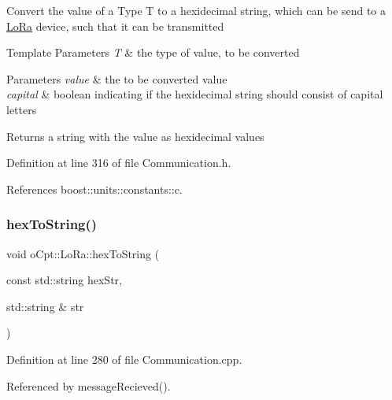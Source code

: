 Convert the value of a Type T to a hexidecimal string, which can be send to a \hyperlink{classo_cpt_1_1_lo_ra}{Lo\+Ra} device, such that it can be transmitted 
\begin{DoxyTemplParams}{Template Parameters}
{\em T} & the type of value, to be converted \\
\hline
\end{DoxyTemplParams}

\begin{DoxyParams}{Parameters}
{\em value} & the to be converted value \\
\hline
{\em capital} & boolean indicating if the hexidecimal string should consist of capital letters \\
\hline
\end{DoxyParams}
\begin{DoxyReturn}{Returns}
a string with the value as hexidecimal values 
\end{DoxyReturn}


Definition at line 316 of file Communication.\+h.



References boost\+::units\+::constants\+::c.

\hypertarget{classo_cpt_1_1_lo_ra_a9a85cc1457a2e791c4eb4d1805b416fc}{}\label{classo_cpt_1_1_lo_ra_a9a85cc1457a2e791c4eb4d1805b416fc} 
\subsubsection{\texorpdfstring{hex\+To\+String()}{hexToString()}}
{\footnotesize\ttfamily void o\+Cpt\+::\+Lo\+Ra\+::hex\+To\+String (\begin{DoxyParamCaption}\item[{const std\+::string}]{hex\+Str,  }\item[{std\+::string \&}]{str }\end{DoxyParamCaption})\hspace{0.3cm}{\ttfamily [protected]}}



Definition at line 280 of file Communication.\+cpp.



Referenced by message\+Recieved().

